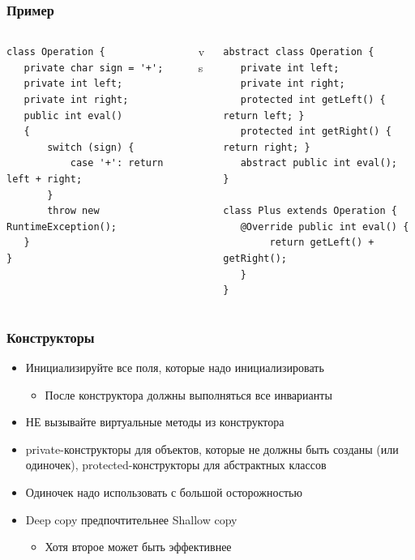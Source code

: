 \documentclass[xetex,mathserif,serif]{beamer}
\begin{document}
	\begin{frame}[fragile]
		\frametitle{Пример}
		\begin{footnotesize}
			\begin{columns}
				\begin{column}{0.35\textwidth}
					\begin{verbatim}
class Operation {
   private char sign = '+';
   private int left;
   private int right;
   public int eval()
   {
       switch (sign) {
           case '+': return left + right;
       }
       throw new RuntimeException();
   }
}
					\end{verbatim}
				\end{column}
				\begin{column}{0.1\textwidth}
					vs
				\end{column}
				\begin{column}{0.45\textwidth}
					\begin{verbatim}
abstract class Operation {
   private int left;
   private int right;
   protected int getLeft() { return left; }
   protected int getRight() { return right; }
   abstract public int eval();
}

class Plus extends Operation {
   @Override public int eval() { 
        return getLeft() + getRight(); 
   }
}
					\end{verbatim}
				\end{column}
			\end{columns}
		\end{footnotesize}
	\end{frame}

	\begin{frame}
		\frametitle{Конструкторы}
		\begin{itemize}
			\item Инициализируйте все поля, которые надо инициализировать
			\begin{itemize}
				\item После конструктора должны выполняться все инварианты
			\end{itemize}
			\item НЕ вызывайте виртуальные методы из конструктора
			\item private-конструкторы для объектов, которые не должны быть созданы (или одиночек), protected-конструкторы для абстрактных классов
			\item Одиночек надо использовать с большой осторожностью
			\item Deep copy предпочтительнее Shallow copy
			\begin{itemize}
				\item Хотя второе может быть эффективнее
			\end{itemize}
		\end{itemize}
	\end{frame}
\end{document}
